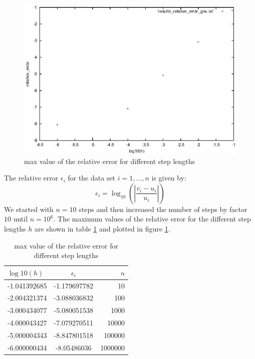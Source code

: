 \documentclass[11pt,a4wide]{article}
\begin{document}
\begin{figure}[b]
\centering
\includegraphics [scale=1] {relerr.eps}
\caption{max value of the relative error for different step lengths}
\label{A}
\end{figure}

The relative error $\epsilon_{i}$ for the data set $ i= 1,...,n$ is given by:
\begin{equation}
\epsilon_{i} = \log_{10}\left(\left|\dfrac{v_{i}-u_{i}}{u_{i}}\right|\right)
\end{equation}
We started with $n=10$ steps and then increased the number of steps by factor $10$ until $n=10^6$. The maximum values of the relative error for the different step lengths $h$ are shown in table \ref{tab: rel. error} and plotted in figure \ref{A}.
\begin{table}[b]
\centering
\caption{max value of the relative error for different step lengths}
\label{tab: rel. error}
\begin{tabular}{lcr}\hline
	$\log10(h)$ & $\epsilon_i$ & $n$ \\
	\hline
	-1.041392685 & -1.179697782 & 10 \\
  -2.004321374 & -3.088036832 & 100 \\
  -3.000434077 & -5.080051538 & 1000 \\
  -4.000043427 & -7.079270511 & 10000 \\
  -5.000004343 & -8.847801518 & 100000 \\
  -6.000000434 & -8.05486036  & 1000000 \\	
\end{tabular}
\end{table}
\end{document}
